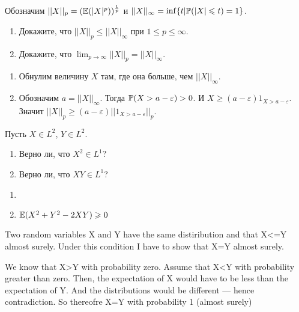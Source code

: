 \begin{problem}
\label{L beskonechnost} Обозначим
$||X||_{p}=(\E(|X|^{p}))^{\frac{1}{p}}$ и
$||X||_{\infty}=\inf\{t|\P(|X|\le t)=1\}$.
\begin{enumerate}
\item Докажите, что $||X||_{p}\le ||X||_{\infty}$ при $1\le p\le
\infty$.
\item Докажите, что $\lim_{p\to\infty}||X||_{p}=||X||_{\infty}$.
\end{enumerate}

\begin{sol}
\begin{enumerate}
\item  Обнулим величину $X$ там, где она больше, чем $||X||_{\infty}$.
\item Обозначим $a=||X||_{\infty}$. Тогда $\P(X>a-\varepsilon)>0$. И
$X\ge (a-\varepsilon)1_{X>a-\varepsilon}$. Значит $||X||_{p}\ge
(a-\varepsilon)||1_{X>a-\varepsilon}||_{p}$.
\end{enumerate}
\end{sol}
\end{problem}

\begin{problem}
\label{X2Y2XY} Пусть $X\in L^{2}$, $Y\in L^{2}$.
\begin{enumerate}
\item Верно ли, что $X^{2}\in L^{1}$?
\item Верно ли, что $XY\in L^{1}$?
\end{enumerate}

\begin{sol}
\begin{enumerate}
\item
\item $\E(X^{2}+Y^{2}-2XY)\ge 0$
\end{enumerate}
\end{sol}
\end{problem}

\begin{problem}
Two random variables X and Y have the same distiribution and that X<=Y almost surely.
Under this condition I have to show that X=Y almost surely.

\begin{sol}

We know that X>Y with probability zero. Assume that X<Y with probability greater than zero. Then, the expectation of X would have to be less than the expectation of Y. And the distributions would be different — hence contradiction. So thereofre X=Y with probability 1 (almost surely)
\end{sol}
\end{problem}

